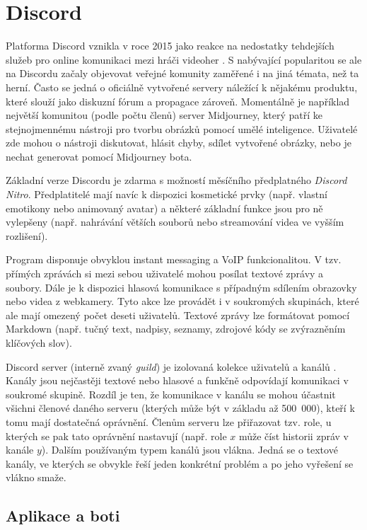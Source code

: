\documentclass[FM]{tulthesis}
\begin{document}
	\section{Discord}
	
	Platforma Discord vznikla v roce 2015 jako reakce na nedostatky tehdejších služeb pro online komunikaci mezi hráči videoher \cite{lit_Discord}. S nabývající popularitou se ale na Discordu začaly objevovat veřejné komunity zaměřené i na jiná témata, než ta herní. Často se jedná o oficiálně vytvořené servery náležící k nějakému produktu, které slouží jako diskuzní fórum a propagace zároveň. Momentálně je například největší komunitou (podle počtu členů) server Midjourney, který patří ke stejnojmennému nástroji pro tvorbu obrázků pomocí umělé inteligence. Uživatelé zde mohou o nástroji diskutovat, hlásit chyby, sdílet vytvořené obrázky, nebo je nechat generovat pomocí Midjourney bota.
	
	Základní verze Discordu je zdarma s možností měsíčního předplatného \textit{Discord Nitro}. Předplatitelé mají navíc k dispozici kosmetické prvky (např. vlastní emotikony nebo animovaný avatar) a některé základní funkce jsou pro ně vylepšeny (např. nahrávání větších souborů nebo streamování videa ve vyšším rozlišení).	

	Program disponuje obvyklou instant messaging a VoIP funkcionalitou. V tzv. přímých zprávách si mezi sebou uživatelé mohou posílat textové zprávy a soubory. Dále je k dispozici hlasová komunikace s případným sdílením obrazovky nebo videa z webkamery. Tyto akce lze provádět i v soukromých skupinách, které ale mají omezený počet deseti uživatelů. Textové zprávy lze formátovat pomocí Markdown (např. tučný text, nadpisy, seznamy, zdrojové kódy se zvýrazněním klíčových slov).
	
	Discord server (interně zvaný \textit{guild}) je izolovaná kolekce uživatelů a kanálů \cite{doc_Discord}. Kanály jsou nejčastěji textové nebo hlasové a funkčně odpovídají komunikaci v soukromé skupině. Rozdíl je ten, že komunikace v kanálu se mohou účastnit všichni členové daného serveru (kterých může být v základu až 500~000), kteří k tomu mají dostatečná oprávnění. Členům serveru lze přiřazovat tzv. role, u kterých se pak tato oprávnění nastavují (např. role $x$ může číst historii zpráv v kanále $y$). Dalším používaným typem kanálů jsou vlákna. Jedná se o textové kanály, ve kterých se obvykle řeší jeden konkrétní problém a po jeho vyřešení se vlákno smaže.
	
	\subsection{Aplikace a boti}
	
\end{document}
